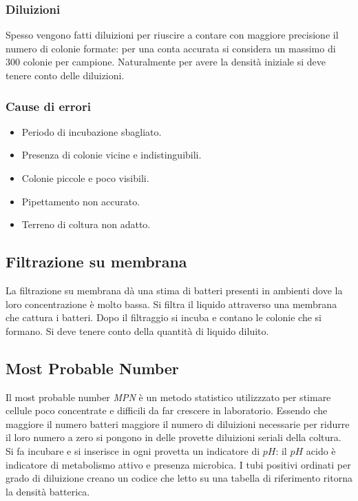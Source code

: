 		\subsubsection{Diluizioni}
		Spesso vengono fatti diluizioni per riuscire a contare con maggiore precisione il numero di colonie formate: per una conta accurata si considera un massimo di $300$ colonie per campione.
		Naturalmente per avere la densit\`a iniziale si deve tenere conto delle diluizioni.

		\subsubsection{Cause di errori}
		\begin{multicols}{2}
			\begin{itemize}
				\item Periodo di incubazione sbagliato.
				\item Presenza di colonie vicine e indistinguibili.
				\item Colonie piccole e poco visibili.
				\item Pipettamento non accurato.
				\item Terreno di coltura non adatto.
			\end{itemize}
		\end{multicols}

	\subsection{Filtrazione su membrana}
	La filtrazione su membrana d\`a una stima di batteri presenti in ambienti dove la loro concentrazione \`e molto bassa.
	Si filtra il liquido attraverso una membrana che cattura i batteri.
	Dopo il filtraggio si incuba e contano le colonie che si formano.
	Si deve tenere conto della quantit\`a di liquido diluito.

	\subsection{Most Probable Number}
	Il most probable number \emph{MPN} \`e un metodo statistico utilizzzato per stimare cellule poco concentrate e difficili da far crescere in laboratorio.
	Essendo che maggiore il numero batteri maggiore il numero di diluizioni necessarie per ridurre il loro numero a zero si pongono in delle provette diluizioni seriali della coltura.
	Si fa incubare e si inserisce in ogni provetta un indicatore di $pH$: il $pH$ acido \`e indicatore di metabolismo attivo e presenza microbica.
	I tubi positivi ordinati per grado di diluizione creano un codice che letto su una tabella di riferimento ritorna la densit\`a batterica.

